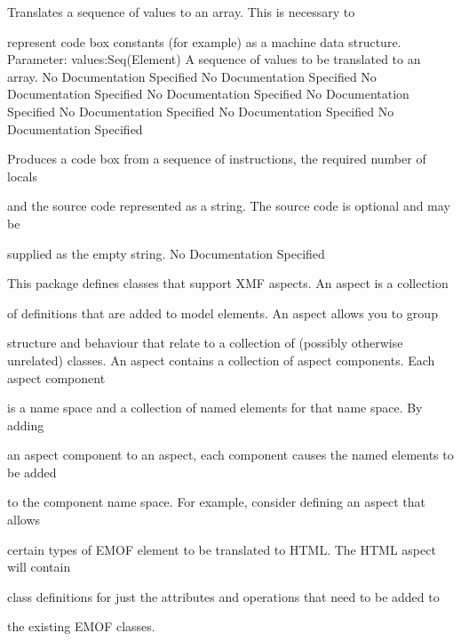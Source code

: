           Translates a sequence of values to an array. This is necessary to

          represent code box constants (for example) as a machine data structure.
          Parameter: values:Seq(Element)
            A sequence of values to be translated to an array.
No Documentation Specified
No Documentation Specified
No Documentation Specified
No Documentation Specified
No Documentation Specified
No Documentation Specified
No Documentation Specified
No Documentation Specified

        Produces a code box from a sequence of instructions, the required number of locals

        and the source code represented as a string. The source code is optional and may be

        supplied as the empty string.
No Documentation Specified

      This package defines classes that support XMF aspects. An aspect is a collection

      of definitions that are added to model elements. An aspect allows you to group

      structure and behaviour that relate to a collection of (possibly otherwise unrelated)
      classes. An aspect contains a collection of aspect components. Each aspect component

      is a name space and a collection of named elements for that name space. By adding

      an aspect component to an aspect, each component causes the named elements to be added

      to the component name space. For example, consider defining an aspect that allows

      certain types of EMOF element to be translated to HTML. The HTML aspect will contain

      class definitions for just the attributes and operations that need to be added to

      the existing EMOF classes.

